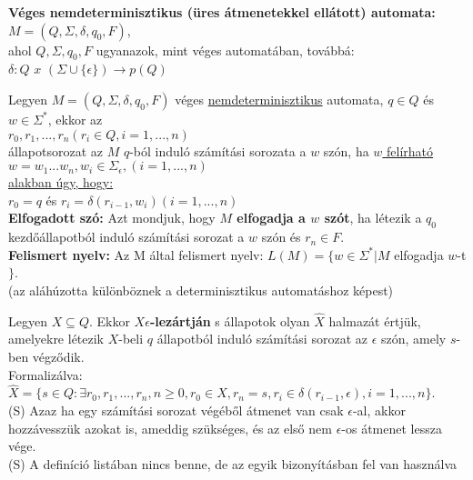 \documentclass{beamer}
\newcommand{\mmedskip}{\vspace{0.5em}}
\newcommand{\mbigskip}{\vspace{1em}}
\begin{document}
\begin{frame}
\begin{tcolorbox}[title={Def.: Nemdeterminisztikus automata}]
\textbf{Véges nemdeterminisztikus (üres átmenetekkel ellátott) automata:}\\
\mmedskip
$M = (Q, {\Sigma}, {\delta}, q_0, F)$,\\
\mmedskip
ahol $Q, {\Sigma}, q_0, F$ ugyanazok, mint véges automatában, továbbá:\\
\mmedskip
$\delta : Q$ $x$ $({\Sigma} \cup \{{\epsilon}\}) \rightarrow p(Q)$
\end{tcolorbox}

\begin{tcolorbox}[title={squeezed Def.: Számítási sorozat, elfogadott szó, felismert nyelv}]
Legyen $M = (Q, {\Sigma}, {\delta}, q_0, F)$ véges \underline{nemdeterminisztikus} automata, $q \in Q$ és \underline{$w \in {\Sigma}^*$}, ekkor az\\
\mmedskip
$r_0, r_1, ..., r_n (r_i \in Q, i = 1, ..., n)$\\
\mmedskip
állapotsorozat az $M$ $q$-ból induló számítási sorozata a $w$ szón, ha \underline{$w$ felírható}\\
\mmedskip
\underline{$w = w_1 ... w_n, w_i \in {\Sigma}_{\epsilon}, (i = 1, ..., n)$}\\
\mmedskip
\underline{alakban úgy, hogy:}\\
\mmedskip
$r_0 = q$ és $r_i = {\delta}(r_{i - 1}, w_i)(i = 1, ..., n)$\\
\mbigskip
\textbf{Elfogadott szó:} Azt mondjuk, hogy \textbf{$M$ elfogadja a $w$ szót}, ha létezik a $q_0$ kezdőállapotból induló számítási sorozat a $w$ szón és $r_n \in F$.\\
\mbigskip
\textbf{Felismert nyelv:} Az M által felismert nyelv: $L(M) = \{w \in {\Sigma}^* | M$ elfogadja $w$-t$\}$.\\
\mbigskip
(az aláhúzotta különböznek a determinisztikus automatáshoz képest)
\end{tcolorbox}

\begin{tcolorbox}[title={Def.: $X \epsilon$-lezártja}]
Legyen $X \subseteq Q$. Ekkor \textbf{$X \epsilon$-lezártján} s állapotok olyan $\widehat{X}$ halmazát értjük, amelyekre létezik $X$-beli $q$ állapotból induló számítási sorozat az $\epsilon$ szón, amely $s$-ben végződik.\\
Formalizálva:\\
$\widehat{X} = \{s \in Q : {\exists}r_0,r_1,...,r_n, n \geq 0, r_0 \in X, r_n = s, r_i \in {\delta}(r_{i - 1}, {\epsilon}), i = 1, ..., n\}$.\\
{\tiny (S) Azaz ha egy számítási sorozat végéből átmenet van csak $\epsilon$-al, akkor hozzávesszük azokat is, ameddig szükséges, és az első nem $\epsilon$-os átmenet lessza vége.}\\
{\tiny (S) A definíció listában nincs benne, de az egyik bizonyításban fel van használva}
\end{tcolorbox}
\end{frame}
\end{document}
